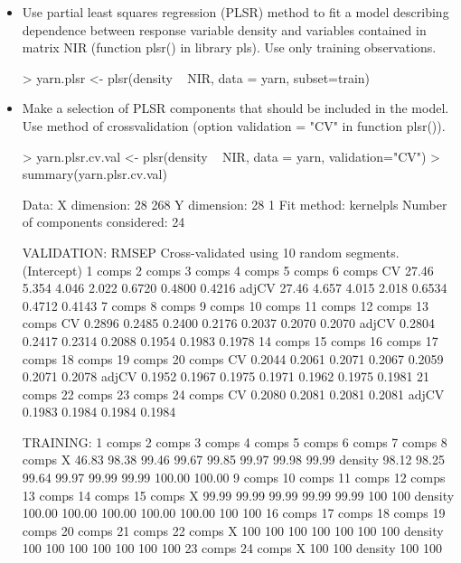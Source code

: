 \documentclass[a4paper]{article}
\begin{document}
\begin{itemize}
\item Use partial least squares regression (PLSR) method to fit a model
describing dependence between response variable density and variables contained in matrix NIR (function plsr() in library pls). Use only training observations.
\begin{Schunk}
\begin{Sinput}
> yarn.plsr <- plsr(density ~ NIR, data = yarn, subset=train)	
\end{Sinput}
\end{Schunk}
\item Make a selection of PLSR components that should be included in the model.
Use method of crossvalidation (option validation = "CV" in function plsr()).

\begin{Schunk}
\begin{Sinput}
> yarn.plsr.cv.val <- plsr(density ~ NIR, data = yarn, validation="CV")
> summary(yarn.plsr.cv.val)
\end{Sinput}
\begin{Soutput}
Data: 	X dimension: 28 268 
	Y dimension: 28 1
Fit method: kernelpls
Number of components considered: 24

VALIDATION: RMSEP
Cross-validated using 10 random segments.
       (Intercept)  1 comps  2 comps  3 comps  4 comps  5 comps  6 comps
CV           27.46    5.354    4.046    2.022   0.6720   0.4800   0.4216
adjCV        27.46    4.657    4.015    2.018   0.6534   0.4712   0.4143
       7 comps  8 comps  9 comps  10 comps  11 comps  12 comps  13 comps
CV      0.2896   0.2485   0.2400    0.2176    0.2037    0.2070    0.2070
adjCV   0.2804   0.2417   0.2314    0.2088    0.1954    0.1983    0.1978
       14 comps  15 comps  16 comps  17 comps  18 comps  19 comps  20 comps
CV       0.2044    0.2061    0.2071    0.2067    0.2059    0.2071    0.2078
adjCV    0.1952    0.1967    0.1975    0.1971    0.1962    0.1975    0.1981
       21 comps  22 comps  23 comps  24 comps
CV       0.2080    0.2081    0.2081    0.2081
adjCV    0.1983    0.1984    0.1984    0.1984

TRAINING: % variance explained
         1 comps  2 comps  3 comps  4 comps  5 comps  6 comps  7 comps  8 comps
X          46.83    98.38    99.46    99.67    99.85    99.97    99.98    99.99
density    98.12    98.25    99.64    99.97    99.99    99.99   100.00   100.00
         9 comps  10 comps  11 comps  12 comps  13 comps  14 comps  15 comps
X          99.99     99.99     99.99     99.99     99.99       100       100
density   100.00    100.00    100.00    100.00    100.00       100       100
         16 comps  17 comps  18 comps  19 comps  20 comps  21 comps  22 comps
X             100       100       100       100       100       100       100
density       100       100       100       100       100       100       100
         23 comps  24 comps
X             100       100
density       100       100
\end{Soutput}
\end{Schunk}


\end{itemize}
\end{document}

